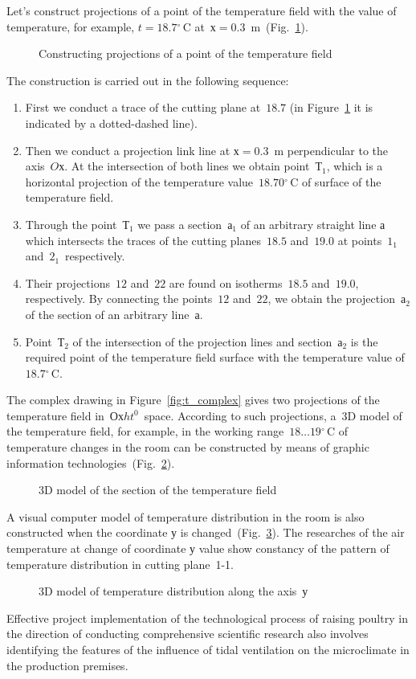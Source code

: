 \documentclass[12pt,twoside]{article}
\newcommand{\FigRef}[2][]{(Fig.~\ref{#2}\textit{#1})}
\newcommand{\degC}{{}^{\circ}\,\text{C}} %
\begin{document}
\begin{JGGarticle}
			Let's construct projections of a point of the temperature field with the value of temperature, for example, $t = 18.7\degC$ at~$х = 0.3$~m~\FigRef{fig:t_constr_proj_point}.
			\begin{figure}[!hbt]
				\caption{Constructing projections of a point of the temperature field}
				\label{fig:t_constr_proj_point}
			\end{figure}
			The construction is carried out in the following sequence:
			\begin{enumerate}
				\item First we conduct a trace of the cutting plane at~$18.7$ (in Figure~\ref{fig:t_constr_proj_point} it is indicated by a dotted-dashed line).
				\item Then we conduct a projection link line at
				$х = 0.3$~m perpendicular to the axis~$Oх$. At the intersection of both lines we obtain point~$Т_1$, which is a horizontal projection of the temperature value~$18.70\degC$ of surface of the temperature field.
				\item Through the point~$Т_1$ we pass a section~$а_1$ of an arbitrary straight line а which intersects the traces of the cutting planes~$18.5$ and~$19.0$ at points~$1_1$ and~$2_1$~respectively.
				\item Their projections~$12$ and~$22$ are found on isotherms~$18.5$ and~$19.0$, respectively. By connecting the points~$12$ and~$22$, we obtain the projection~$а_2$ of the section of an arbitrary line~$а$.
				\item Point~$Т_2$ of the intersection of the projection lines and section~$а_2$ is the required point of the temperature field surface with the temperature value of~$18.7\degC$.
			\end{enumerate}
			The complex drawing in Figure~\ref{fig:t_complex} gives two projections of the temperature field in~$Охht^0$~space. According to such projections, a~$3$D model of the temperature field, for example, in the working range~$18 \dots 19\degC$ of temperature changes in the room can be constructed by means of graphic information technologies~\FigRef{fig:t_3D}.
			\begin{figure}[!hbt]
				\caption{3D model of the section of the temperature field}
				\label{fig:t_3D}
			\end{figure}
			A visual computer model of temperature distribution in the room is also constructed when the coordinate у is changed~\FigRef{fig:t_along_3D}.
			The researches of the air temperature at change of coordinate у value show constancy of the pattern of temperature distribution in cutting plane~1-1.
			\begin{figure}[!hbt]
				\caption{3D model of temperature distribution along the axis~$у$}
				\label{fig:t_along_3D}
			\end{figure}
			Effective project implementation of the technological process of raising poultry in the direction of conducting comprehensive scientific research also involves identifying the features of the influence of tidal ventilation on the microclimate in the production premises.
			

\end{JGGarticle}
\end{document}
